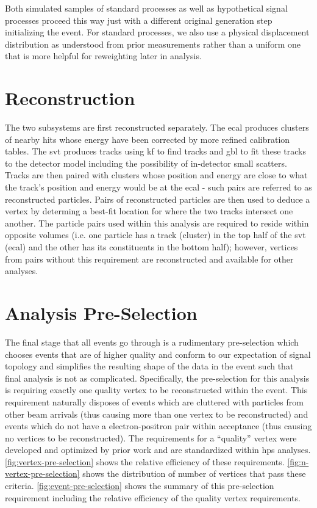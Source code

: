 Both simulated samples of standard processes as well as hypothetical signal processes proceed this way
just with a different original generation step initializing the event. For standard processes, we also
use a physical displacement distribution as understood from prior measurements rather than a uniform
one that is more helpful for reweighting later in analysis.

\section{Reconstruction}
The two subsystems are first reconstructed separately.
The \ac{ecal} produces clusters of nearby hits whose energy
have been corrected by more refined calibration tables.
The \ac{svt} produces tracks using \ac{kf} to find tracks
and \ac{gbl} to fit these tracks to the detector model including
the possibility of in-detector small scatters.
Tracks are then paired with clusters whose position and energy
are close to what the track's position and energy would be at
the \ac{ecal} - such pairs are referred to as reconstructed
particles.
Pairs of reconstructed particles are then used to deduce a
vertex by determing a best-fit location for where the two tracks
intersect one another.
The particle pairs used within this analysis are required to reside
within opposite volumes (i.e. one particle has a track (cluster)
in the top half of the \ac{svt} (\ac{ecal}) and the other has its
constituents in the bottom half); however, vertices from pairs
without this requirement are reconstructed and available for
other analyses.

\section{Analysis Pre-Selection}
The final stage that all events go through is a rudimentary pre-selection which chooses events
that are of higher quality and conform to our expectation of signal topology and simplifies the
resulting shape of the data in the event such that final analysis is not as complicated.
Specifically, the pre-selection for this analysis is requiring exactly one quality vertex to be
reconstructed within the event.
This requirement naturally disposes of events which are cluttered with particles from other beam arrivals
(thus causing more than one vertex to be reconstructed) and
events which do not have a electron-positron pair within acceptance (thus causing no vertices to be
reconstructed).
The requirements for a ``quality'' vertex were developed and optimized by 
prior work\cite{aspellman-thesis-2024} and are standardized within \ac{hps} analyses.
\cref{fig:vertex-pre-selection} shows the relative efficiency of these requirements.
\cref{fig:n-vertex-pre-selection} shows the distribution of number of vertices
that pass these criteria.
\cref{fig:event-pre-selection} shows the summary of this pre-selection requirement including the relative
efficiency of the quality vertex requirements.

